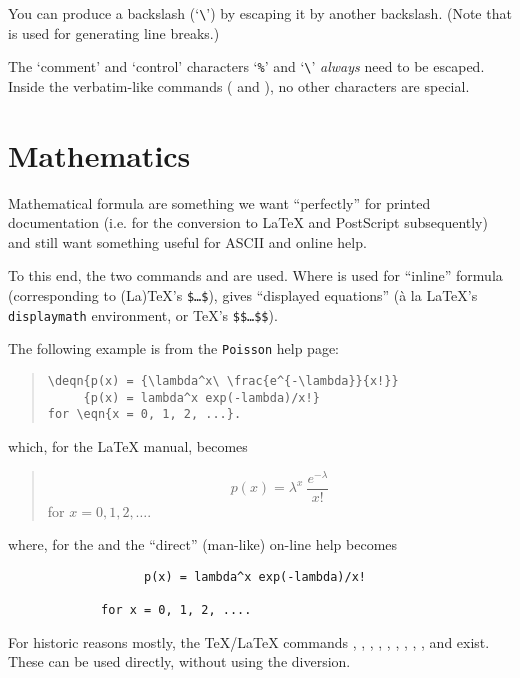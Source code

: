 You can produce a backslash (`\verb|\|') by escaping it by another
backslash.  (Note that  is used for generating line breaks.)

The `comment' and `control' characters `\texttt{\%}' and `\verb|\|'
\emph{always} need to be escaped.  Inside the verbatim-like commands
( and ), no other characters are special.

\section{Mathematics}

Mathematical formula are something we want ``perfectly'' for printed
documentation (i.e. for the conversion to \LaTeX{} and PostScript
subsequently) and still want something useful for ASCII and \HTML{}
online help.

To this end, the two commands
 and
 are used.  Where
 is used for ``inline'' formula (corresponding to (La)\TeX{}'s
\texttt{\$\ldots{}\$}),  gives ``displayed equations'' ({\`a} la
\LaTeX{}'s \texttt{displaymath} environment, or \TeX{}'s
\texttt{\$\$\ldots\$\$}).

The following example is from the \texttt{Poisson} help page:
\begin{quote}
\begin{verbatim}
\deqn{p(x) = {\lambda^x\ \frac{e^{-\lambda}}{x!}}
     {p(x) = lambda^x exp(-lambda)/x!}
for \eqn{x = 0, 1, 2, ...}.
\end{verbatim}
\end{quote}
which, for the \LaTeX{} manual, becomes
\begin{quote}
  \[ p(x) = \lambda^x\ \frac{e^{-\lambda}}{x!}  \]
  for $ x = 0, 1, 2, \ldots $.
\end{quote}
where, for the \HTML{} and the ``direct'' (man-like) on-line help
becomes
\begin{verbatim}
                   p(x) = lambda^x exp(-lambda)/x!

             for x = 0, 1, 2, ....
\end{verbatim}

For historic reasons mostly, the TeX/LaTeX commands ,
, , , , ,
, , ,  and  exist.
These can be used directly, without using the  diversion.

